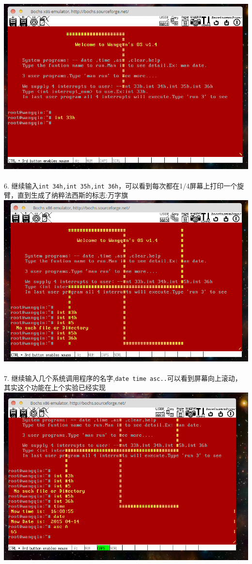 \documentclass[a4paper]{article}
\begin{document}
{{\center\includegraphics[scale=0.5]{Illustrations/int33h.png}}\\\\
6. 继续输入\verb|int 34h,int 35h,int 36h|，可以看到每次都在1/4屏幕上打印一个旋臂，直到生成了纳粹法西斯的标志:万字旗
{\center\includegraphics[scale=0.5]{Illustrations/allcustomint.png}}\\\\
7. 继续输入几个系统调用程序的名字,\verb|date time asc..|可以看到屏幕向上滚动，其实这个功能在上个实验已经实现
{\center\includegraphics[scale=0.5]{Illustrations/syscall.png}}\\\\
}
\end{document}
